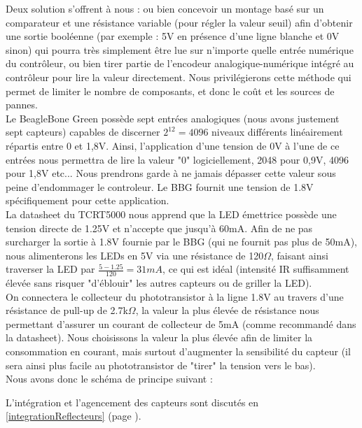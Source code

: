 			Deux solution s'offrent à nous : ou bien concevoir un montage basé sur un comparateur et une résistance variable (pour régler la valeur seuil) afin d'obtenir une sortie booléenne (par exemple : 5V en présence d'une ligne blanche et 0V sinon) qui pourra très simplement être lue sur n'importe quelle entrée numérique du contrôleur, ou bien tirer partie de l'encodeur analogique-numérique intégré au contrôleur pour lire la valeur directement. Nous privilégierons cette méthode qui permet de limiter le nombre de composants, et donc le coût et les sources de pannes.\\

			Le BeagleBone Green possède sept entrées analogiques (nous avons justement sept capteurs) capables de discerner $2^{12} = 4096$ niveaux différents linéairement répartis entre 0 et 1,8V\cite{bib6}.
			Ainsi, l'application d'une tension de 0V à l'une de ce entrées nous permettra de lire la valeur "0" logiciellement, 2048 pour 0,9V, 4096 pour 1,8V etc... Nous prendrons garde à ne jamais dépasser cette valeur sous peine d’endommager le controleur. Le BBG fournit une tension de 1.8V spécifiquement pour cette application\cite{bib6}.\\

			La datasheet du TCRT5000 \cite{bib7} nous apprend que la LED émettrice possède une tension directe de 1.25V et n'accepte que jusqu'à 60mA.
			Afin de ne pas surcharger la sortie à 1.8V fournie par le BBG (qui ne fournit pas plus de 50mA), nous alimenterons les LEDs en 5V via une résistance de 120$\Omega$, faisant ainsi traverser la LED par $\frac{5-1.25}{120}=31mA$, ce qui est idéal (intensité IR suffisamment élevée sans risquer "d'éblouir" les autres capteurs ou de griller la LED).\\

			On connectera le collecteur du phototransistor à la ligne 1.8V au travers d'une résistance de pull-up de 2.7k$\Omega$, la valeur la plus élevée de résistance nous permettant d'assurer un courant de collecteur de 5mA (comme recommandé dans la datasheet). Nous choisissons la valeur la plus élevée afin de limiter la consommation en courant, mais surtout d'augmenter la sensibilité du capteur (il sera ainsi plus facile au phototransistor de "tirer" la tension vers le bas).\\

			Nous avons donc le schéma de principe suivant :

			L'intégration et l'agencement des capteurs sont discutés en \ref{integrationReflecteurs} (page \pageref{integrationReflecteurs}).

